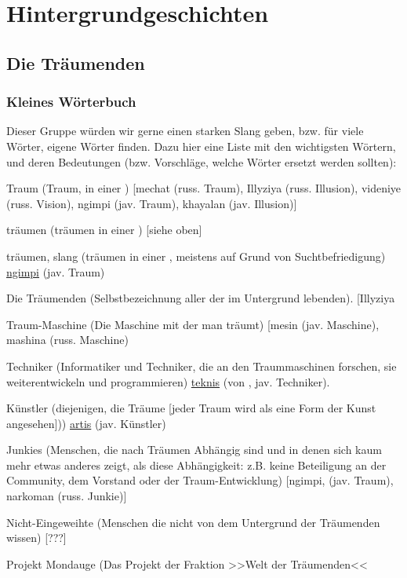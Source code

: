 \documentclass[12pt, a4paper, openany]{report}
\let\tempone\itemize
\let\temptwo\enditemize
\renewenvironment{itemize}{\tempone\addtolength{\itemsep}{-0.5\baselineskip}}{\temptwo}
\begin{document}
\section{Hintergrundgeschichten}

\subsection{Die Träumenden} 

\subsubsection{Kleines Wörterbuch}
Dieser Gruppe würden wir gerne einen starken Slang geben, bzw. für viele Wörter, eigene Wörter finden. 
Dazu hier eine Liste mit den wichtigsten Wörtern, und deren Bedeutungen (bzw. Vorschläge, welche Wörter ersetzt werden sollten):
\begin{itemize}
  \item Traum (Traum, in einer ) [mechat (russ. Traum), Illyziya (russ. Illusion), videniye (russ. Vision), ngimpi (jav. Traum), khayalan (jav. Illusion)]
  \item träumen (träumen in einer ) [siehe oben]
  \item träumen, slang (träumen in einer , meistens auf Grund von Suchtbefriedigung) \underline{ngimpi} (jav. Traum)
  \item Die Träumenden (Selbstbezeichnung aller der im Untergrund lebenden). [Illyziya
  \item Traum-Maschine (Die Maschine mit der man träumt) [mesin (jav. Maschine), mashina (russ. Maschine)
  \item Techniker (Informatiker und Techniker, die an den Traummaschinen forschen, sie weiterentwickeln und programmieren) \underline{teknis} (von , jav. Techniker).
  \item Künstler (diejenigen, die Träume [jeder Traum wird als eine Form der Kunst angesehen])) \underline{artis} (jav. Künstler)
  \item Junkies (Menschen, die nach Träumen Abhängig sind und in denen sich kaum mehr etwas anderes zeigt, als diese Abhängigkeit: z.B. keine Beteiligung an der Community, dem Vorstand oder der Traum-Entwicklung) [ngimpi, (jav. Traum), narkoman (russ. Junkie)]
  \item Nicht-Eingeweihte (Menschen die nicht von dem Untergrund der Träumenden wissen) [???]
  \item Projekt Mondauge (Das Projekt der Fraktion >>Welt der Träumenden<<
\end{itemize}
\end{document}
